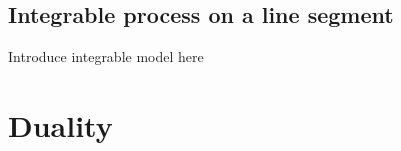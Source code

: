 \documentclass[11pt]{article}
\numberwithin{equation}{section}
\numberwithin{equation}{subsection}
\newcommand{\twoj}{\nu}
\begin{document}

 
\subsection{Integrable process on a line segment}
{\color{red}Introduce integrable model here}

\section{Duality}\label{sectionDuality}
\end{document}
